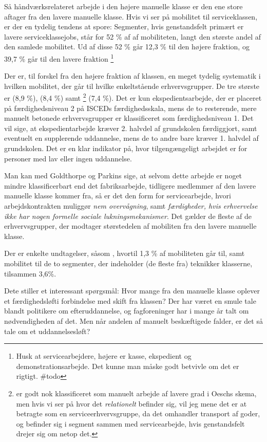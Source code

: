 \begin{landscape}
Så håndværksrelateret arbejde i den højere manuelle klasse er den ene store aftager fra den lavere manuelle klasse. Hvis vi ser på mobilitet til serviceklassen, er der en tydelig tendens at spore: Segmenter, hvis genstandsfelt primært er lavere serviceklassejobs, står for 52 \% af af mobiliteten, langt den største andel af den samlede mobilitet. Ud af disse 52 \% går 12,3 \% til den højere fraktion, og 39,7 \% går til den lavere fraktion%
%
    \footnote{ Husk at servicearbejdere, højere er kasse, ekspedient og demonstrationsarbejde. Det kunne man måske godt betvivle om det er rigtigt. \#todo}%
%

Der er, til forskel fra den højere fraktion af klassen, en meget tydelig systematik i hvilken mobilitet, der går til hvilke enkeltstående erhvervsgrupper. De tre største er  (8,9 \%),  (8,4 \%) samt %
%
    \footnote{  er godt nok klassificeret som manuelt arbejde af lavere grad i Oeschs skema, men hvis vi ser på hvor det \emph{relationelt} befinder sig, vil jeg mene det er at betragte som en serviceerhvervsgruppe, da det omhandler transport af goder, og befinder sig i segment sammen med servicearbejde, hvis genstandsfelt drejer sig om netop det.} 
%
(7,4 \%). Det er kun ekspedientsarbejde, der er placeret på færdighedsniveau 2 på ISCEDs færdighedsskala, mens de to resterende, mere manuelt betonede erhvervsgrupper er klassificeret som færdighedsniveau 1. Det vil sige, at ekspedientarbejde kræver 2. halvdel af grundskolen færdiggjort, samt eventuelt en supplerende uddannelse, mens de to andre bare kræver 1. halvdel af grundskolen. Det er en klar indikator på, hvor tilgengængeligt arbejdet er for personer med lav eller ingen uddannelse.

Man kan med Goldthorpe og Parkins sige, at selvom dette arbejde er noget mindre klassificerbart end det fabriksarbejde, tidligere medlemmer af den lavere manuelle klasse kommer fra, så er det den form for servicearbejde, hvori arbejdskontrakten muliggør \emph{nem overvågning}, samt \emph{færdigheder, hvis erhvervelse ikke har nogen formelle sociale lukningsmekanismer}. Det gælder de fleste af de erhvervsgrupper, der modtager størstedelen af mobiliten fra den lavere manuelle klasse.

Der er enkelte undtagelser, såsom , hvortil 1,3 \% af mobiliteten går til, samt mobilitet til de to segmenter, der indeholder (de fleste fra) teknikker klasserne, tilsammen 3,6\%. 

Dete stiller et interessant spørgsmål: Hvor mange fra den manuelle klasse oplever et færdighedsløfti forbindelse med skift fra klassen? Der har været en smule tale blandt politikere om efteruddannelse, og fagforeninger har i mange år talt om nødvendigheden af det. Men når andelen af manuelt beskæftigede falder, er det så tale om et uddannelsesløft?

\end{landscape}

